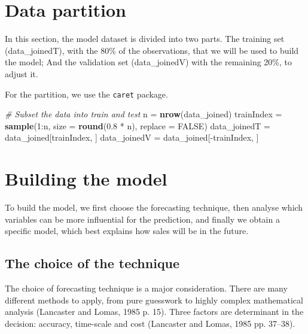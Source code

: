 \documentclass[11pt,]{article}
\newenvironment{Shaded}{\begin{snugshade}}{\end{snugshade}}
\newcommand{\KeywordTok}[1]{\textcolor[rgb]{0.13,0.29,0.53}{\textbf{{#1}}}}
\newcommand{\DataTypeTok}[1]{\textcolor[rgb]{0.13,0.29,0.53}{{#1}}}
\newcommand{\DecValTok}[1]{\textcolor[rgb]{0.00,0.00,0.81}{{#1}}}
\newcommand{\FloatTok}[1]{\textcolor[rgb]{0.00,0.00,0.81}{{#1}}}
\newcommand{\StringTok}[1]{\textcolor[rgb]{0.31,0.60,0.02}{{#1}}}
\newcommand{\CommentTok}[1]{\textcolor[rgb]{0.56,0.35,0.01}{\textit{{#1}}}}
\newcommand{\OtherTok}[1]{\textcolor[rgb]{0.56,0.35,0.01}{{#1}}}
\newcommand{\NormalTok}[1]{{#1}}
\begin{document}
\section{Data partition}\label{data-partition}

In this section, the model dataset is divided into two parts. The
training set (data\_joinedT), with the 80\% of the observations, that we
will be used to build the model; And the validation set (data\_joinedV)
with the remaining 20\%, to adjust it.

For the partition, we use the \texttt{caret} package.

\begin{Shaded}
\begin{Highlighting}[]
\CommentTok{# Subset the data into train and test}
\NormalTok{n =}\StringTok{ }\KeywordTok{nrow}\NormalTok{(data_joined)}
\NormalTok{trainIndex =}\StringTok{ }\KeywordTok{sample}\NormalTok{(}\DecValTok{1}\NormalTok{:n, }\DataTypeTok{size =} \KeywordTok{round}\NormalTok{(}\FloatTok{0.8} \NormalTok{*}\StringTok{ }\NormalTok{n), }\DataTypeTok{replace =} \OtherTok{FALSE}\NormalTok{)}
\NormalTok{data_joinedT =}\StringTok{ }\NormalTok{data_joined[trainIndex, ]}
\NormalTok{data_joinedV =}\StringTok{ }\NormalTok{data_joined[-trainIndex, ]}
\end{Highlighting}
\end{Shaded}

\section{Building the model}\label{building-the-model}

To build the model, we first choose the forecasting technique, then
analyse which variables can be more influential for the prediction, and
finally we obtain a specific model, which best explains how sales will
be in the future.

\subsection{The choice of the
technique}\label{the-choice-of-the-technique}

The choice of forecasting technique is a major consideration. There are
many different methods to apply, from pure guesswork to highly complex
mathematical analysis (Lancaster and Lomas, 1985 p. 15). Three factors
are determinant in the decision: accuracy, time-scale and cost
(Lancaster and Lomas, 1985 pp. 37--38).
\end{document}
